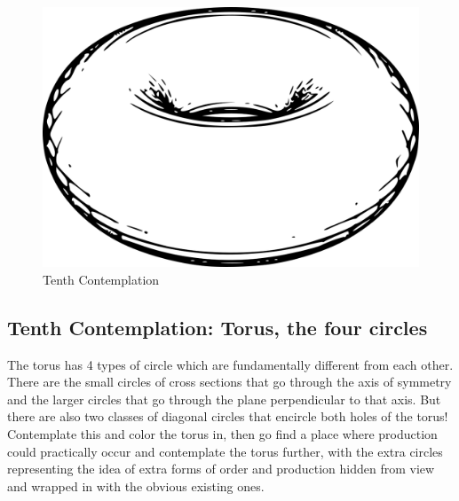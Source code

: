 \begin{figure}[htbp]
\centering
\includegraphics{images/contemplations/contemplation10C.png}
\caption{Tenth Contemplation}
\end{figure}

\subsection{Tenth Contemplation: Torus, the four
circles}\label{tenth-contemplation-torus-the-four-circles}

The torus has 4 types of circle which are fundamentally different from
each other. There are the small circles of cross sections that go
through the axis of symmetry and the larger circles that go through the
plane perpendicular to that axis. But there are also two classes of
diagonal circles that encircle both holes of the torus! Contemplate this
and color the torus in, then go find a place where production could
practically occur and contemplate the torus further, with the extra
circles representing the idea of extra forms of order and production
hidden from view and wrapped in with the obvious existing ones.

